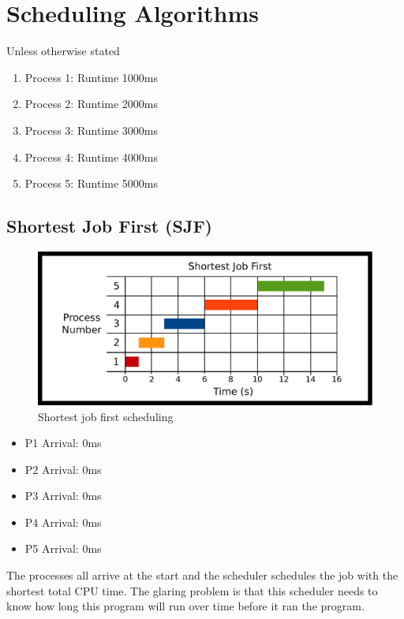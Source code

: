 \section{Scheduling Algorithms}

Unless otherwise stated

\begin{enumerate}
\item Process 1: Runtime 1000ms
\item Process 2: Runtime 2000ms
\item Process 3: Runtime 3000ms
\item Process 4: Runtime 4000ms
\item Process 5: Runtime 5000ms
\end{enumerate}

\subsection{Shortest Job First (SJF)}

\begin{figure}[H]
\centering
\includegraphics[width=\textwidth]{scheduling/drawings/sjf.eps}
\caption{Shortest job first scheduling}
\end{figure}

\begin{itemize}
\tightlist
\item
  P1 Arrival: 0ms
\item
  P2 Arrival: 0ms
\item
  P3 Arrival: 0ms
\item
  P4 Arrival: 0ms
\item
  P5 Arrival: 0ms
\end{itemize}

The processes all arrive at the start and the scheduler schedules the job with the shortest total CPU time.
The glaring problem is that this scheduler needs to know how long this program will run over time before it ran the program.

